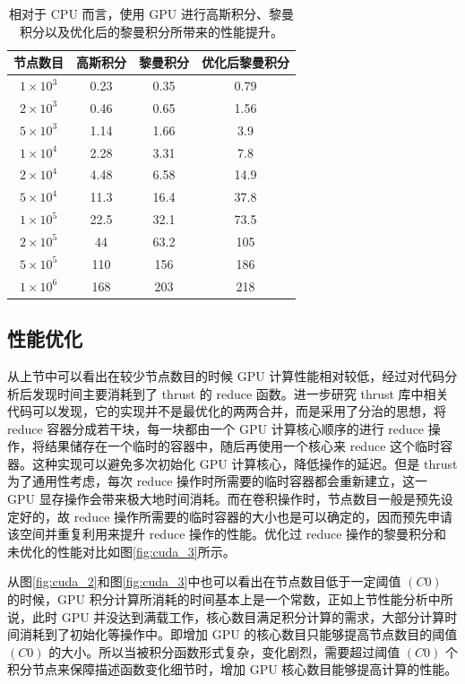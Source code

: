 \begin{table}
    \centering
    \begin{tabular*}{0.8\textwidth}{@{\extracolsep{\fill}}cccc}
        \hline
        \hline							
        节点数目	&	高斯积分	&	黎曼积分	&	优化后黎曼积分	\\\hline
        $1\times10^3$	&	0.23	&	0.35	&	0.79	\\
        $2\times10^3$	&	0.46	&	0.65	&	1.56	\\
        $5\times10^3$	&	1.14	&	1.66	&	3.9	\\
        $1\times10^4$	&	2.28	&	3.31	&	7.8	\\
        $2\times10^4$	&	4.48	&	6.58	&	14.9	\\
        $5\times10^4$	&	11.3	&	16.4	&	37.8	\\
        $1\times10^5$	&	22.5	&	32.1	&	73.5	\\
        $2\times10^5$	&	44	&	63.2	&	105	\\
        $5\times10^5$	&	110	&	156	&	186	\\
        $1\times10^6$	&	168	&	203	&	218	\\
        \hline
        \hline
    \end{tabular*}
    \caption{相对于 CPU 而言，使用 GPU 进行高斯积分、黎曼积分以及优化后的黎曼积分所带来的性能提升。}
    \label{tab:cuda_2}
\end{table}


\subsection{性能优化}

从上节中可以看出在较少节点数目的时候 GPU 计算性能相对较低，经过对代码分析后发现时间主要消耗到了 thrust 的 reduce 函数。进一步研究 thrust 库中相关代码可以发现，它的实现并不是最优化的两两合并，而是采用了分治的思想，将 reduce 容器分成若干块，每一块都由一个 GPU 计算核心顺序的进行 reduce 操作，将结果储存在一个临时的容器中，随后再使用一个核心来 reduce 这个临时容器。这种实现可以避免多次初始化 GPU 计算核心，降低操作的延迟。但是 thrust 为了通用性考虑，每次 reduce 操作时所需要的临时容器都会重新建立，这一 GPU 显存操作会带来极大地时间消耗。而在卷积操作时，节点数目一般是预先设定好的，故 reduce 操作所需要的临时容器的大小也是可以确定的，因而预先申请该空间并重复利用来提升 reduce 操作的性能。优化过 reduce 操作的黎曼积分和未优化的性能对比如图\ref{fig:cuda_3}所示。

从图\ref{fig:cuda_2}和图\ref{fig:cuda_3}中也可以看出在节点数目低于一定阈值 $(C0)$ 的时候，GPU 积分计算所消耗的时间基本上是一个常数，正如上节性能分析中所说，此时 GPU 并没达到满载工作，核心数目满足积分计算的需求，大部分计算时间消耗到了初始化等操作中。即增加 GPU 的核心数目只能够提高节点数目的阈值 $(C0)$ 的大小。所以当被积分函数形式复杂，变化剧烈，需要超过阈值 $(C0)$ 个积分节点来保障描述函数变化细节时，增加 GPU 核心数目能够提高计算的性能。 


